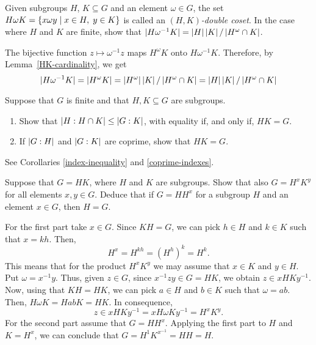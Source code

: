 \begin{probl}\label{HwK}
    Given subgroups $H$, $K \subseteq G$ and an element $\omega \in G$, the set $H\omega K = \{ x\omega y \mid x \in H,\; y \in K \}$ is called an \textsl{$(H,K)$-double coset}. In the case where $H$ and\/ $K$ are finite, show that\/ $|H\omega^{-1} K|=\left\vert{H}\right\vert\left\vert{K}\right\vert/\left\vert{H^\omega\cap K}\right\vert$.
\end{probl}

\begin{solution} The bijective function $z\mapsto \omega^{-1} z$ maps $H^\omega K$ onto $H\omega^{-1}K$. Therefore, by Lemma~\ref{HK-cardinality}, we get
$$
    |H\omega^{-1}K|=\left\vert{H^\omega K}\right\vert=\left\vert{H^\omega}\right\vert\left\vert{K}\right\vert/\left\vert{H^\omega\cap K}\right\vert
        = \left\vert{H}\right\vert\left\vert{K}\right\vert/\left\vert{H^\omega\cap K}\right\vert
$$
 \end{solution}

\begin{probl}\label{problem-1.A.3} Suppose that $G$ is finite and that $H , K \subseteq G$ are subgroups. 
    \begin{enumerate}[\rm a)]
        \item Show that $\left\vert{H:H \cap K}\right\vert \leq \left\vert{G:K}\right\vert$, with equality if, and only if, $HK=G$.
        \item If\/ $\left\vert{G:H}\right\vert$ and $\left\vert{G:K}\right\vert$ are coprime, show that $HK=G$.
    \end{enumerate}
\end{probl}

\begin{solution} See Corollaries \ref{index-inequality} and \ref{coprime-indexes}.  \end{solution}

\begin{probl}\label{problem-1.A.4}
    Suppose that $G = H K$, where $H$ and $K$ are subgroups. Show that also $G = H^xK^y$ for all elements $x,y \in G$. Deduce that if\/ $G = HH^x$ for a subgroup $H$ and an element $x \in G$, then $H = G$.
\end{probl}

\begin{solution} For the first part take $x\in G$. Since $KH=G$, we can pick $h\in H$ and $k\in K$ such that $x=kh$. Then,
$$
    H^x=H^{kh}=(H^h)^k=H^k.
$$
This means that for the product $H^xK^y$ we may assume that $x\in K$ and $y\in H$. Put\/ $\omega=x^{-1}y$. Thus, given $z\in G$, since $x^{-1}zy\in G=HK$, we obtain $z\in xHKy^{-1}$. Now, using that $KH=HK$, we can pick $a\in H$ and $b\in K$ such that $\omega=ab$. Then, $H\omega K=HabK=HK$. In consequence,
$$
    z\in xHKy^{-1}=xH\omega Ky^{-1}=H^xK^y.
$$
For the second part assume that $G=HH^x$. Applying the first part to $H$ and $K=H^x$, we can conclude that $G=H^1K^{x^{-1}}=HH=H$.  \end{solution}

